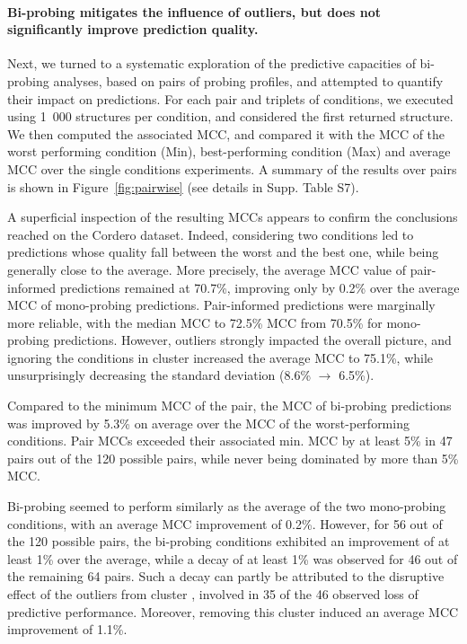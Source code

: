 \documentclass[a4,center,fleqn]{NAR}
\begin{document}
\paragraph{Bi-probing mitigates the influence of outliers, but does not significantly improve prediction quality.}
Next, we turned to a systematic exploration of the predictive capacities of bi-probing analyses, based on pairs of probing profiles, and attempted to quantify their impact on \OurTool predictions. For each pair and triplets of conditions, we executed \OurTool using 1~000 structures per condition, and considered the first returned structure. We then computed the associated MCC, and compared it with the MCC of the worst performing condition (Min), best-performing condition (Max) and average MCC over the single conditions experiments. A summary of the results over pairs is shown in Figure~\ref{fig:pairwise} (see details in Supp. Table S7). 

A superficial inspection of the resulting MCCs appears to confirm the conclusions reached on the Cordero\etal\cite{Cordero2012} dataset. Indeed, considering two conditions led to predictions whose quality fall between the worst and the best one, while being generally close to the average. More precisely, the average MCC value of pair-informed predictions remained at 70.7\%, improving only by 0.2\% over the average MCC of mono-probing predictions. Pair-informed predictions were marginally more reliable, with the median MCC  to 72.5\% MCC from 70.5\% for mono-probing predictions. However, outliers strongly impacted the overall picture, and ignoring the conditions in cluster  increased the average MCC to 75.1\%, while unsurprisingly decreasing the standard deviation (8.6\% $\to$ 6.5\%).

Compared to the minimum MCC of the pair, the MCC of bi-probing predictions was improved by 5.3\% on average over the MCC of the worst-performing conditions. Pair MCCs exceeded their associated min. MCC by at least 5\% in 47 pairs out of the 120 possible pairs, while never being dominated by more than  5\% MCC. 

Bi-probing seemed to perform similarly as the average of the two mono-probing conditions, with an average MCC improvement of 0.2\%. However, for 56 out of the 120 possible pairs, the bi-probing conditions exhibited an improvement of at least 1\% over the average, while a decay of at least 1\% was observed for 46 out of the remaining 64 pairs. Such a decay can partly be attributed to the disruptive effect of the outliers from cluster , involved in 35 of the 46 observed loss of predictive performance. Moreover, removing this cluster induced an average MCC improvement of 1.1\%.
\end{document}
